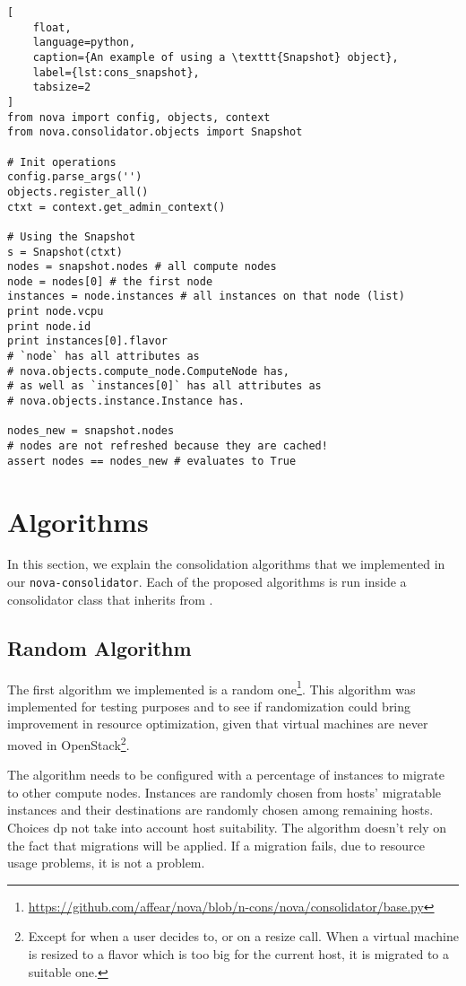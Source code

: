 \begin{lstlisting}[
	float,
	language=python,
	caption={An example of using a \texttt{Snapshot} object},
	label={lst:cons_snapshot},
	tabsize=2
]
from nova import config, objects, context
from nova.consolidator.objects import Snapshot

# Init operations
config.parse_args('')
objects.register_all()
ctxt = context.get_admin_context()

# Using the Snapshot
s = Snapshot(ctxt)
nodes = snapshot.nodes # all compute nodes
node = nodes[0] # the first node
instances = node.instances # all instances on that node (list)
print node.vcpu
print node.id
print instances[0].flavor
# `node` has all attributes as
# nova.objects.compute_node.ComputeNode has,
# as well as `instances[0]` has all attributes as
# nova.objects.instance.Instance has.

nodes_new = snapshot.nodes
# nodes are not refreshed because they are cached!
assert nodes == nodes_new # evaluates to True
\end{lstlisting}

\section{Algorithms}
\label{sec:cons_algs}
In this section, we explain the consolidation algorithms that we implemented in our \texttt{nova-consolidator}. Each of the proposed algorithms is run inside a consolidator class that inherits from .

\subsection{Random Algorithm}
\label{sub:algs_rnd}
The first algorithm we implemented is a random one\footnote{\url{https://github.com/affear/nova/blob/n-cons/nova/consolidator/base.py}}. This algorithm was implemented for testing purposes and to see if randomization could bring improvement in resource optimization, given that virtual machines are never moved in OpenStack\footnote{Except for when a user decides to, or on a resize call. When a virtual machine is resized to a flavor which is too big for the current host, it is migrated to a suitable one.}.

The algorithm needs to be configured with a percentage of instances to migrate to other compute nodes. Instances are randomly chosen from hosts' migratable instances and their destinations are randomly chosen among remaining hosts. Choices dp not take into account host suitability. The algorithm doesn't rely on the fact that migrations will be applied. If a migration fails, due to resource usage problems, it is not a problem.

